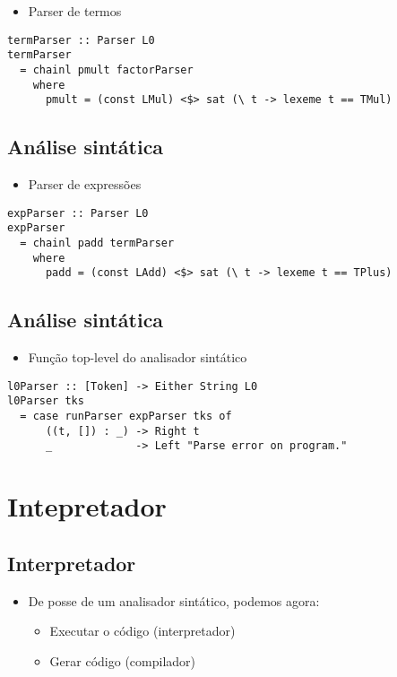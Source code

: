 \documentclass[11pt]{article}
\begin{document}
\begin{itemize}
\item Parser de termos
\end{itemize}

\begin{verbatim}
termParser :: Parser L0 
termParser 
  = chainl pmult factorParser
    where  
      pmult = (const LMul) <$> sat (\ t -> lexeme t == TMul)
\end{verbatim}
\subsection*{Análise sintática}
\label{sec:org1d63e6c}

\begin{itemize}
\item Parser de expressões
\end{itemize}

\begin{verbatim}
expParser :: Parser L0 
expParser 
  = chainl padd termParser
    where 
      padd = (const LAdd) <$> sat (\ t -> lexeme t == TPlus)
\end{verbatim}
\subsection*{Análise sintática}
\label{sec:orgaf9b577}

\begin{itemize}
\item Função top-level do analisador sintático
\end{itemize}

\begin{verbatim}
l0Parser :: [Token] -> Either String L0 
l0Parser tks 
  = case runParser expParser tks of 
      ((t, []) : _) -> Right t 
      _             -> Left "Parse error on program."
\end{verbatim}
\section*{Intepretador}
\label{sec:org6960555}

\subsection*{Interpretador}
\label{sec:orga853b71}

\begin{itemize}
\item De posse de um analisador sintático, podemos agora:
\begin{itemize}
\item Executar o código (interpretador)
\item Gerar código (compilador)
\end{itemize}
\end{itemize}
\end{document}
